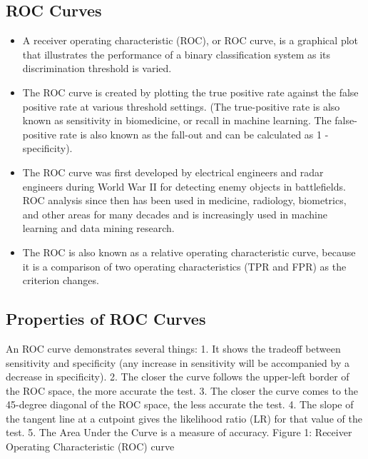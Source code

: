\documentclass[]{report}
\begin{document}
\subsection{ROC Curves}
\begin{itemize}
\item  A receiver operating characteristic (ROC), or ROC curve, is a graphical plot that illustrates
the performance of a binary classification system as its discrimination threshold is varied.
\item  The ROC curve is created by plotting the true positive rate against the false positive rate at
various threshold settings. (The true-positive rate is also known as sensitivity in biomedicine,
or recall in machine learning. The false-positive rate is also known as the fall-out and can be
calculated as 1 - specificity).
\item  The ROC curve was first developed by electrical engineers and radar engineers during World
War II for detecting enemy objects in battlefields. ROC analysis since then has been used in
medicine, radiology, biometrics, and other areas for many decades and is increasingly used
in machine learning and data mining research.
\item  The ROC is also known as a relative operating characteristic curve, because it is a comparison
of two operating characteristics (TPR and FPR) as the criterion changes.
\end{itemize}
\subsection{Properties of ROC Curves}
An ROC curve demonstrates several things:
1. It shows the tradeoff between sensitivity and specificity (any increase in sensitivity will be
accompanied by a decrease in specificity).
2. The closer the curve follows the upper-left border of the ROC space, the more accurate the
test.
3. The closer the curve comes to the 45-degree diagonal of the ROC space, the less accurate the
test.
4. The slope of the tangent line at a cutpoint gives the likelihood ratio (LR) for that value of
the test.
5. The Area Under the Curve is a measure of accuracy.
Figure 1: Receiver Operating Characteristic (ROC) curve
\end{document}
